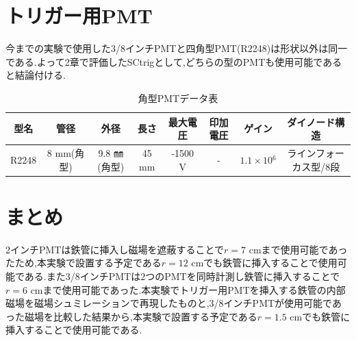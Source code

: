 \section{トリガー用PMT}
今までの実験で使用した3/8インチPMT\cite{pmtH3164-10}と四角型PMT(R2248)\cite{pmtR2248}は形状以外は同一である.よって2章で評価したSCtrigとして,どちらの型のPMTも使用可能であると結論付ける.

\begin{table}[h]
	\centering
	  \begin{tabular}{cccccccc} \hline
		型名& 管径 & 外径 & 長さ & 最大電圧 & 印加電圧 & ゲイン & ダイノード構造 \\ \hline \hline
		R2248 & 8 mm(角型) & 9.8 ㎜(角型)& 45 mm & -1500 V & - & $1.1\times10{^{6}}$ &ラインフォーカス型/8段 \\ \hline
	\end{tabular}
	  \caption{角型PMTデータ表}
\end{table}

\section{まとめ}
2インチPMTは鉄管に挿入し磁場を遮蔽することで$r=7$ cmまで使用可能であったため,本実験で設置する予定である$r=12$ cmでも鉄管に挿入することで使用可能である.また3/8インチPMTは2つのPMTを同時計測し鉄管に挿入することで$r=6$ cmまで使用可能であった.本実験でトリガー用PMTを挿入する鉄管の内部磁場を磁場シュミレーションで再現したものと,3/8インチPMTが使用可能であった磁場を比較した結果から,本実験で設置する予定である$r=1.5$ cmでも鉄管に挿入することで使用可能である.



